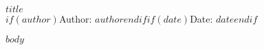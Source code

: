 \documentclass[11pt]{article}
\begin{document}
\begin{center}
{\LARGE $title$}\\[4pt]
\normalsize $if(author)$Author: $author$\quad$endif$$if(date)$Date: $date$$endif$
\end{center}
\vspace{1em}

\begin{Form}

$body$

\end{Form}
\end{document}
